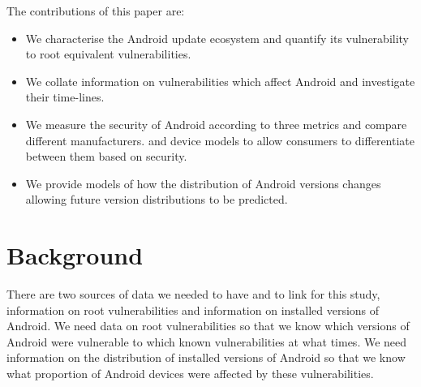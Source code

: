 \documentclass[conference,a4paper,twoside]{IEEEtran}
\begin{document}
The contributions of this paper are:
\begin{itemize}
 \item We characterise the Android update ecosystem and quantify its vulnerability to root equivalent vulnerabilities.
 \item We collate information on vulnerabilities which affect Android and investigate their time-lines.
 \item We measure the security of Android according to three metrics and compare different manufacturers. and device models to allow consumers to differentiate between them based on security.
 \item We provide models of how the distribution of Android versions changes allowing future version distributions to be predicted.
\end{itemize}

\section{Background}
\label{sec:background}
There are two sources of data we needed to have and to link for this study, information on root vulnerabilities and information on installed versions of Android.
We need data on root vulnerabilities so that we know which versions of Android were vulnerable to which known vulnerabilities at what times.
We need information on the distribution of installed versions of Android so that we know what proportion of Android devices were affected by these vulnerabilities.
\end{document}
